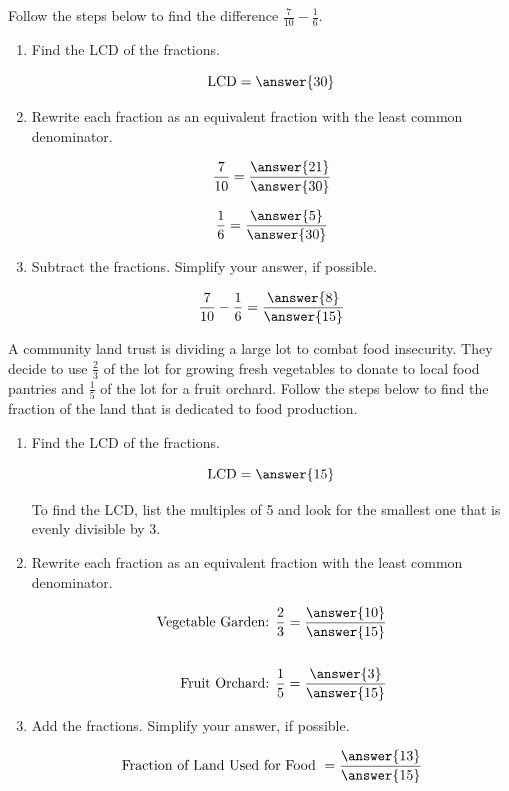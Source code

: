 \documentclass{ximera}
\begin{document}
\begin{problem}
Follow the steps below to find the difference $\frac{7}{10} - \frac{1}{6}.$


\begin{enumerate}
\item Find the LCD of the fractions.

\[ \textrm{LCD} = \answer{30} \]

\item Rewrite each fraction as an equivalent fraction with the least common denominator.

\[ \frac{7}{10} = \frac{\answer{21}}{\answer{30}} \]

\[ \frac{1}{6} = \frac{\answer{5}}{\answer{30}} \]


\item Subtract the fractions.  Simplify your answer, if possible.

\[ \frac{7}{10} - \frac{1}{6} = \frac{\answer{8}}{\answer{15}} \]

\end{enumerate}
\end{problem}


\begin{problem}
A community land trust is dividing a large lot to combat food insecurity. They decide to use $\textstyle \frac{2}{3}$ of
the lot for growing fresh vegetables to donate to local food pantries and $\textstyle \frac{1}{5}$ of the lot for a fruit
orchard.  Follow the steps below to find the fraction of the land that is dedicated to food production.

\begin{enumerate}
\item Find the LCD of the fractions.

\[ \textrm{LCD} = \answer{15} \]

\begin{hint}
      To find the LCD, list the multiples of 5 and look for the smallest one that is evenly divisible by 3.
    \end{hint}


  \item Rewrite each fraction as an equivalent fraction with the least common denominator.

    \begin{align*}
        \text{Vegetable Garden: } \frac{2}{3} &= \frac{\answer{10}}{\answer{15}} \\
                                                & \\
        \text{Fruit Orchard: } \frac{1}{5} &= \frac{\answer{3}}{\answer{15}}
    \end{align*}

  \item Add the fractions.  Simplify your answer, if possible.

  \[ \textrm{Fraction of Land Used for Food} \ = \frac{\answer{13}}{\answer{15}} \]

    \end{enumerate}
\end{problem}
\end{document}
